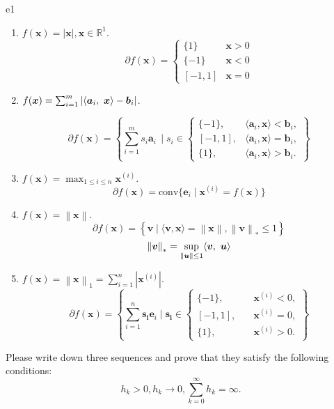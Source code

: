 \documentclass{article}
\newcommand{\aB}{\bm{a}}
\newcommand{\bB}{\bm{b}}
\newcommand{\xB}{\bm{x}}
\newcommand{\vB}{\bm{v}}
\newcommand{\uB}{\bm{u}}
\newcommand{\RBB}{\mathbb{R}}
\newcommand{\normgen}[1]{\left\| #1 \right\|}
\newcommand{\normone}[1]{\left\| #1 \right\|_1}
\begin{document}
\begin{SOLUTION}{e1}
\begin{enumerate}
	\item $f(\xB) = |\xB|, \xB \in \RBB^1$.
	\[
	\partial f(\xB) = \begin{cases}
		\{1\} & \xB > 0 \\
		\{-1\} & \xB < 0 \\
		[-1, 1] & \xB = 0
	\end{cases}
	\]
	\item $f(\xB) = \sum_{i=1}^{m} | \innerproduct{\aB_i}{\xB} - \bB_i|$.
	
	\[
	\partial f(\bm{x}) = \left\{ \sum_{i=1}^{m} s_{i} \aB_{i} \, \mid s_{i} \in 
	\begin{cases} 
	\{-1\}, & \langle \aB_i, \bm{x} \rangle < \bB_{i}, \\ 
	[-1, 1], & \langle \aB_i, \bm{x} \rangle = \bB_{i}, \\ 
	\{1\}, & \langle \aB_i, \bm{x} \rangle > \bB_{i}.
	\end{cases} 
	\right\}
	\]
	\item $f(\xB) = \max_{1 \leq i \leq n} \xB^{(i)}$.
	\[
		\partial f(\bm{x}) = \text{conv} \{ \bm{e}_{i} \mid \bm{x}^{(i)} = f(\bm{x}) \}
	\]
	\item $f(\xB) = \normgen{\xB}$.
	\[
	\partial f(\xB) = \left\{ \vB \mid \langle \vB, \xB \rangle = \normgen{\xB}, \normgen{\vB}_* \leq 1 \right\}
	\]
	\[
	\normgen{\vB}_* = \sup_{ \normgen{\uB} \leq 1} \innerproduct{\vB}{\uB}
	\]
	\item $f(\xB) = \normone{\xB} = \sum_{i=1}^{n} |\xB^{(i)}|$.
	\[
	\partial f(\xB) = \left\{ \sum_{i=1}^{n} \bm{s_{i}} \bm{e}_{i}  \mid \bm{s_{i}} \in 
	\begin{cases} 
	\{-1\}, & \quad \xB^{(i)} < 0, \\ 
	[-1, 1], & \quad \xB^{(i)} = 0, \\ 
	\{1\}, & \quad \xB^{(i)} > 0.
	\end{cases}\right\}
	\]
\end{enumerate}
\end{SOLUTION}
\newpage
\begin{excercise}\label{e2}
Please write down three sequences and prove that they satisfy the following conditions:
\[
 h_k > 0, h_k \to 0, \sum_{k=0}^{\infty} h_k = \infty.
 \]
\end{excercise}
\end{document}
